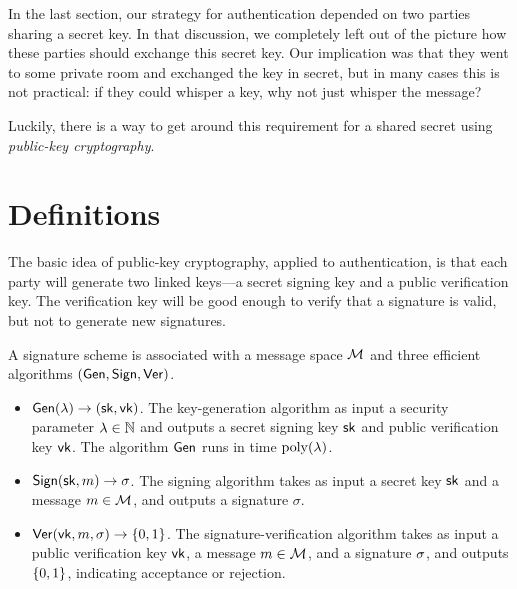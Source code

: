 
In the last section, our strategy for
authentication depended on two parties sharing a
secret key.
In that discussion, we completely left
out of the picture how these parties should
exchange this secret key.
Our implication was that they
went to some private room and exchanged the key in
secret, but in many cases this is not practical:
if they could whisper a key, why not just whisper the message?

Luckily, there is a way to get around this requirement for a shared secret using \emph{public-key cryptography}.\cite{DH76} %

\section{Definitions}
The basic idea of public-key cryptography, applied
to authentication, is that each party will
generate two linked keys---a secret signing key
and a public verification key.
The verification key will be good enough to verify that a signature
is valid, but not to generate new signatures.

\begin{definition}
	A signature scheme is associated with a message space $\mathcal{M}$ and three efficient algorithms $(\mathsf{Gen}, \mathsf{Sign}, \mathsf{Ver})$.

	\begin{itemize}
    \item $\mathsf{Gen}(\lambda) \to ({\mathsf{sk}}, \mathsf{vk})$.
      The key-generation algorithm as input a security parameter $\lambda \in \mathbb{N}$ and outputs a secret signing key ${\mathsf{sk}}$ and public verification key $\mathsf{vk}$.
      The algorithm $\mathsf{Gen}$ runs in time $\operatorname{poly}(\lambda)$.
    \item $\mathsf{Sign}({\mathsf{sk}}, m) \to \sigma$.
      The signing algorithm takes as input a secret key ${\mathsf{sk}}$ and a message $m \in \mathcal{M}$, and outputs a signature $\sigma$.
    \item $\mathsf{Ver}(\mathsf{vk}, m, \sigma) \to \{0,1\}$.
      The signature-verification algorithm takes as input a public verification key $\mathsf{vk}$, a message $m \in \mathcal{M}$, and a signature $\sigma$, 
      and outputs $\{0,1\}$, indicating acceptance or rejection.
	\end{itemize}
	
\end{definition}

